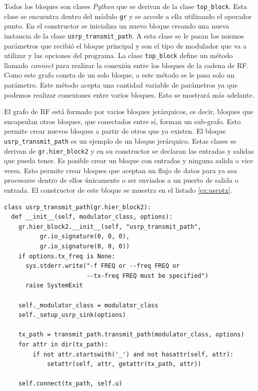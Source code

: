 Todos los bloques son clases \emph{Python} que se derivan de la clase \verb|top_block|. Esta clase se
encuentra dentro del m\'odulo \verb|gr| y se accede a ella utilizando el operador punto. En el
constructor se inicializa un nuevo bloque creando una nueva instancia de la clase
\verb|usrp_transmit_path|. A esta clase se le pasan los mismos par\'ametros que recibi\'o el bloque
principal y son el tipo de modulador que va a utilizar y las opciones del programa. La clase
\verb|top_block| define un m\'etodo llamado \emph{connect} para realizar la conexi\'on entre los
bloques de la cadena de RF. Como este grafo consta de un solo bloque, a este m\'etodo
se le pasa solo un par\'ametro. Este m\'etodo acepta una cantidad variable de par\'ametros ya que
podemos realizar conexiones entre varios bloques. Esto se mostrar\'a m\'as adelante.

El grafo de RF est\'a formado por varios bloques jer\'arquicos, es decir, bloques que encapsulan
otros bloques, que conectados entre s\'i, forman un sub-grafo. Esto permite crear nuevos bloques a
partir de otros que ya existen. El bloque \verb|usrp_transmit_path| es un ejemplo de un bloque
jer\'arquico. Estas clases se derivan de \verb|gr.hier_block2| y en su constructor se declaran las
entradas y salidas que pueda tener. Es posible crear un bloque con entradas y ninguna salida o vice
versa. Esto permite crear bloques que aceptan un flujo de datos para ya sea procesarse dentro de
ellos \'unicamente o ser enviados a un puerto de salida o entrada. El constructor de este bloque se
muestra en el listado \ref{ex:usrptx}.

\begin{lstlisting}[float, frame=single, label=ex:usrptx, caption={Constructor del bloque transmisor
del USRP.}] 
class usrp_transmit_path(gr.hier_block2):
  def __init__(self, modulator_class, options):
    gr.hier_block2.__init__(self, "usrp_transmit_path",
          gr.io_signature(0, 0, 0), 
          gr.io_signature(0, 0, 0)) 
    if options.tx_freq is None:
      sys.stderr.write("-f FREQ or --freq FREQ or 
                       --tx-freq FREQ must be specified")
      raise SystemExit

    self._modulator_class = modulator_class
    self._setup_usrp_sink(options)

    tx_path = transmit_path.transmit_path(modulator_class, options)
    for attr in dir(tx_path): 
        if not attr.startswith('_') and not hasattr(self, attr):
            setattr(self, attr, getattr(tx_path, attr))

    self.connect(tx_path, self.u)
\end{lstlisting}

